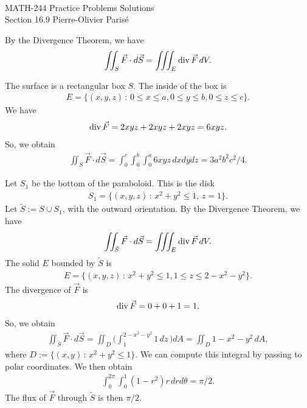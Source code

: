 


	\noindent \hrulefill \\
	MATH-244 \semester \hfill Practice Problems Solutions\\
	Section 16.9 \hfill Pierre-Olivier Paris{\'e} \\\vspace*{-1cm}
	
	\noindent\hrulefill
	
	\spc	

	By the Divergence Theorem, we have
		\begin{align*}
		\iint_S \vec{F} \cdot d\vec{S} = \iiint_E \mathrm{div}\, \vec{F} \, dV .
		\end{align*}
	
	The surface is a rectangular box $S$. The inside of the box is
		\begin{align*}
		E = \{ (x, y, z) \, : \, 0 \leq x \leq a , 0 \leq y \leq b , 0 \leq z \leq c \} .
		\end{align*}
	We have
		\begin{align*}
		\mathrm{div}\, \vec{F} = 2xyz + 2xyz + 2xyz = 6xyz .
		\end{align*}
	So, we obtain
		\begin{align*}
		\iint_S \vec{F} \cdot d\vec{S} = \int_0^c \int_0^b \int_0^a 6xyz \, dxdydz = 3a^2 b^2 c^2/4 .
		\end{align*}
	
	\spc
	
	Let $S_1$ be the bottom of the paraboloid. This is the disk
		\begin{align*}
		S_1 = \{ (x, y, z) \, : \, x^2 + y^2 \leq 1 , \, z = 1 \} .
		\end{align*}
	Let $\tilde{S} := S \cup S_1$, with the outward orientation. By the Divergence Theorem, we have
		\begin{align*}
		\iint_{\tilde{S}} \vec{F} \cdot d\vec{S} = \iiint_E \mathrm{div}\, \vec{F} \, dV .
		\end{align*}
	The solid $E$ bounded by $\tilde{S}$ is
		\begin{align*}
		E = \{ (x, y, z) \, : \, x^2 + y^2 \leq 1 , 1 \leq z \leq 2 - x^2 - y^2 \} .
		\end{align*}
	The divergence of $\vec{F}$ is
		\begin{align*}
		\mathrm{div}\, \vec{F} = 0 + 0 + 1 = 1 .
		\end{align*}
	So, we obtain
		\begin{align*}
		\iint_{\tilde{S}} \vec{F} \cdot d\vec{S} = \iint_{D} \Big( \int_1^{2 - x^2 - y^2} 1 \, dz \, \Big) dA = \iint_D 1 - x^2 - y^2 \, dA ,
		\end{align*}
	where $D := \{  (x, y) \, : \, x^2 + y^2 \leq 1 \}$. We can compute this integral by passing to polar coordinates. We then obtain
		\begin{align*}
		\int_0^{2\pi} \int_0^1 (1 - r^2) r \, dr d\theta = \pi/2 .
		\end{align*}
	The flux of $\vec{F}$ through $\tilde{S}$ is then $\pi/2$.
	
